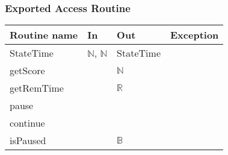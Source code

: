\documentclass[11pt]{article}
\begin{document}
\subsubsection*{Exported Access Routine}
\label{sec:org5213c2c}
\begin{center}
\begin{tabular}{l|l|l|l}
Routine name & In & Out & Exception\\
\hline
StateTime & \(\mathbb{N}\), \(\mathbb{N}\) & StateTime & \\
getScore &  & \(\mathbb{N}\) & \\
getRemTime &  & \(\mathbb{R}\) & \\
pause &  &  & \\
continue &  &  & \\
isPaused &  & \(\mathbb{B}\) & \\
\end{tabular}
\end{center}
\end{document}
